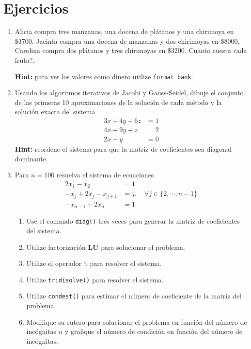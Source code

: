 \documentclass[11pt]{article}
\begin{document}
\section{Ejercicios}
\begin{enumerate}
\item Alicia compra tres manzanas, una docena de pl\'atanos y una chirimoya en \$3700. Jacinta compra una docena de manzanas y dos chirimoyas en \$8000, Carolina compra dos pl\'atanos y tres chirimoyas en \$3200. \textquestiondown Cuanto cuesta cada fruta?.

\textbf{Hint:} para ver los valores como dinero utilize \texttt{format bank}.

\item Usando los algoritmos iterativos de Jacobi y Gauss-Seidel, dibuje el conjunto de las primeras 10 aproximaciones de la soluci\'on de cada m\'etodo y la soluci\'on exacta del sistema
$$
\begin{array}{cl}
3x+4y+6z	& = 1\\
4x+9y+z	& = 2\\
2x+y		& = 0
\end{array}
$$
\textbf{Hint:} reordene el sistema para que la matriz de coeficientes sea diagonal dominante.

\item Para $n=100$ resuelva el sistema de ecuaciones
$$
\begin{array}{ll}
2x_1-x_2			&	=1\\
-x_j+2x_j-x_{j+1}	& 	=j , \quad \forall j\in\{2,\cdots,n-1\}\\
-x_{n-1}+2x_n		&	=1
\end{array}
$$
\begin{enumerate}
\item Use el comando \texttt{diag()} tres veces para generar la matriz de coeficientes del sistema.
\item Utilize factorizaci\'on \textbf{LU} para solucionar el problema.
\item Utilize el operador $\backslash$ para resolver el sistema.
\item Utilize \texttt{tridisolve()} para resolver el sistema.
\item Utilize \texttt{condest()} para estimar el n\'umero de coeficiente de la matriz del problema.
\item Modifique su rutero para solucionar el problema en funci\'on del n\'umero de inc\'ognitas $n$ y grafique el n\'umero de condici\'on en funci\'on del n\'umero de inc\'ognitas.
\end{enumerate}


\end{enumerate}
\end{document}
